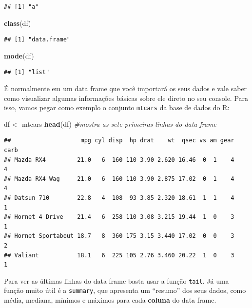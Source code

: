 \documentclass[]{book}
\newenvironment{Shaded}{\begin{snugshade}}{\end{snugshade}}
\newcommand{\KeywordTok}[1]{\textcolor[rgb]{0.13,0.29,0.53}{\textbf{#1}}}
\newcommand{\StringTok}[1]{\textcolor[rgb]{0.31,0.60,0.02}{#1}}
\newcommand{\CommentTok}[1]{\textcolor[rgb]{0.56,0.35,0.01}{\textit{#1}}}
\newcommand{\NormalTok}[1]{#1}
\theoremstyle{definition}
\theoremstyle{definition}
\theoremstyle{definition}
\theoremstyle{remark}
\begin{document}
\begin{verbatim}
## [1] "a"
\end{verbatim}

\begin{Shaded}
\begin{Highlighting}[]
\KeywordTok{class}\NormalTok{(df)}
\end{Highlighting}
\end{Shaded}

\begin{verbatim}
## [1] "data.frame"
\end{verbatim}

\begin{Shaded}
\begin{Highlighting}[]
\KeywordTok{mode}\NormalTok{(df)}
\end{Highlighting}
\end{Shaded}

\begin{verbatim}
## [1] "list"
\end{verbatim}

É normalmente em um data frame que você importará os seus dados e vale
saber como visualizar algumas informações básicas sobre ele direto no
seu console. Para isso, vamos pegar como exemplo o conjunto
\texttt{mtcars} da base de dados do R:

\begin{Shaded}
\begin{Highlighting}[]
\NormalTok{df <-}\StringTok{ }\NormalTok{mtcars}
\KeywordTok{head}\NormalTok{(df) }\CommentTok{#mostra as sete primeiras linhas do data frame}
\end{Highlighting}
\end{Shaded}

\begin{verbatim}
##                    mpg cyl disp  hp drat    wt  qsec vs am gear carb
## Mazda RX4         21.0   6  160 110 3.90 2.620 16.46  0  1    4    4
## Mazda RX4 Wag     21.0   6  160 110 3.90 2.875 17.02  0  1    4    4
## Datsun 710        22.8   4  108  93 3.85 2.320 18.61  1  1    4    1
## Hornet 4 Drive    21.4   6  258 110 3.08 3.215 19.44  1  0    3    1
## Hornet Sportabout 18.7   8  360 175 3.15 3.440 17.02  0  0    3    2
## Valiant           18.1   6  225 105 2.76 3.460 20.22  1  0    3    1
\end{verbatim}

Para ver as últimas linhas do data frame basta usar a função
\texttt{tail}. Já uma função muito útil é a \texttt{summary}, que
apresenta um ``resumo'' dos seus dados, como média, mediana, mínimos e
máximos para cada \textbf{coluna} do data frame.
\end{document}
